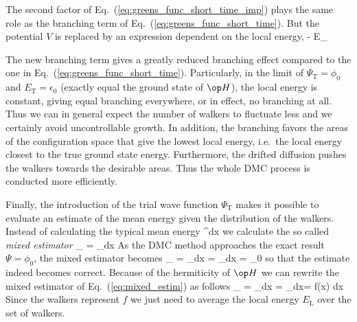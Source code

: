 The second factor of Eq.~(\ref{eq:greens_func_short_time_imp}) plays
the same role as the branching term of
Eq.~(\ref{eq:greens_func_short_time}). But the potential $V$ is
replaced by an expression dependent on the local energy,
\bdm
{}-
E_
\edm

The new branching term gives a greatly reduced branching effect
compared to the one in Eq.~(\ref{eq:greens_func_short_time}).
Particularly, in the limit of $\Psi_\mathrm{T} = \phi_0$ and
$E_\mathrm{T}=\epsilon_0$ (exactly equal the ground state of $\op H$),
the local energy is constant, giving equal branching everywhere, or in
effect, no branching at all. Thus we can in general expect the number
of walkers to fluctuate less and we certainly avoid uncontrollable
growth. In addition, the branching favors the areas of the
configuration space that give the lowest local energy, i.e.~the local
energy closest to the true ground state energy. Furthermore, the drifted
diffusion pushes the walkers towards the desirable areas. Thus the
whole DMC process is conducted more efficiently.

Finally, the introduction of the trial wave function $\Psi_\mathrm{T}$
makes it possible to evaluate an estimate of the mean energy given the
distribution of the walkers. Instead of calculating the typical mean
energy
\bdm
{}
{\int\Psi^\ast\Psi d\vec x}
\edm
we calculate the so called \emph{mixed estimator}
\be
{}_ = 
{\int\Psi_\Psi d\vec x}
\label{eq:mixed_estim}
\ee
As the DMC method approaches the exact result $\Psi=\phi_0$, the mixed
estimator becomes
\bdm
{}_ =
{\int\Psi_\Psi d\vec x} =
{\int\Psi_\Psi d\vec x} =
\epsilon_0
\edm
so that the estimate indeed becomes correct.  Because of the
hermiticity of $\op H$ we can rewrite the mixed estimator of
Eq.~(\ref{eq:mixed_estim}) as follows
\be
{}_ = 
{\int\Psi_\Psi d\vec x} =
{\int\Psi_\Psi d\vec x}=
{\int f(\vec x) d\vec x}
\label{eq:mixed_estim_Elocal}
\ee
Since the walkers represent $f$ we just need to average the local
energy $E_\mathrm{L}$ over the set of walkers.

